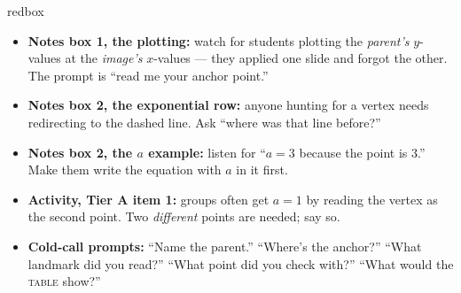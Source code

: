 \documentclass[10pt]{article}
\begin{document}
\begin{skillbox}{redbox}
\begin{itemize}[leftmargin=1.2em, itemsep=2pt, topsep=2pt]
  \item \textbf{Notes box 1, the plotting:} watch for students plotting the \emph{parent's} $y$-values
        at the \emph{image's} $x$-values --- they applied one slide and forgot the other. The prompt
        is ``read me your anchor point.''
  \item \textbf{Notes box 2, the exponential row:} anyone hunting for a vertex needs redirecting to
        the dashed line. Ask ``where was that line before?''
  \item \textbf{Notes box 2, the $a$ example:} listen for ``$a=3$ because the point is $3$.'' Make
        them write the equation with $a$ in it first.
  \item \textbf{Activity, Tier A item 1:} groups often get $a=1$ by reading the vertex as the second
        point. Two \emph{different} points are needed; say so.
  \item \textbf{Cold-call prompts:} ``Name the parent.'' ``Where's the anchor?'' ``What landmark did
        you read?'' ``What point did you check with?'' ``What would the \textsc{table} show?''
\end{itemize}
\end{skillbox}
\end{document}
